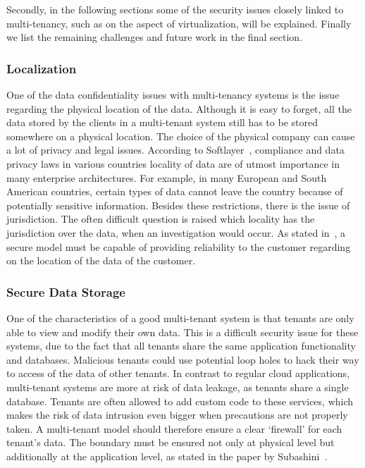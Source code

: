 Secondly, in the following sections some of the security issues closely linked to multi-tenancy, such as on the aspect of virtualization, will be explained. 
Finally we list the remaining challenges and future work in the final section.

\subsubsection{Localization}
One of the data confidentiality issues with multi-tenancy systems is the issue regarding the physical location of the data. 
Although it is easy to forget, all the data stored by the clients in a multi-tenant system still has to be stored somewhere on a physical location. 
The choice of the physical company can cause a lot of privacy and legal issues. 
According to Softlayer~\cite{Softlayer2009Security}, compliance and data privacy laws in various countries locality of data are of utmost importance in many enterprise architectures. 
For example, in many European and South American countries, certain types of data cannot leave the country because of potentially sensitive information. 
Besides these restrictions, there is the issue of jurisdiction.
The often difficult question is raised which locality has the jurisdiction over the data, when an investigation would occur.
As stated in~\cite{Subashini2011Security}, a secure model must be capable of providing reliability to the customer regarding on the location of the data of the customer.

\subsubsection{Secure Data Storage}
One of the characteristics of a good multi-tenant system is that tenants are only able to view and modify their own data. 
This is a difficult security issue for these systems, due to the fact that all tenants share the same application functionality and databases. 
Malicious tenants could use potential loop holes to hack their way to access of the data of other tenants. 
In contrast to regular cloud applications, multi-tenant systems are more at risk of data leakage, as tenants share a single database.
Tenants are often allowed to add custom code to these services, which makes the risk of data intrusion even bigger when precautions are not properly taken. 
A multi-tenant model should therefore ensure a clear ‘firewall’ for each tenant’s data.
The boundary must be ensured not only at physical level but additionally at the application level, as stated in the paper by Subashini~\cite{Subashini2011Security}.\\


